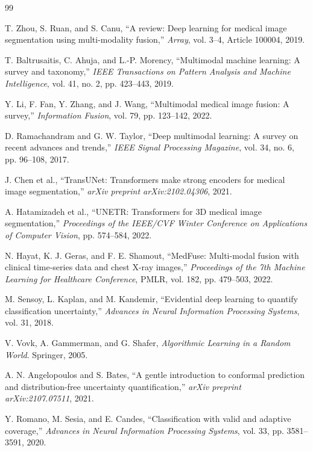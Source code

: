 \documentclass[preprint,11pt]{elsarticle}
\begin{document}
\begin{thebibliography}{99}

T. Zhou, S. Ruan, and S. Canu,
``A review: Deep learning for medical image segmentation using multi-modality fusion,''
\emph{Array}, vol. 3--4, Article 100004, 2019.

T. Baltrusaitis, C. Ahuja, and L.-P. Morency,
``Multimodal machine learning: A survey and taxonomy,''
\emph{IEEE Transactions on Pattern Analysis and Machine Intelligence}, vol. 41, no. 2, pp. 423--443, 2019.

Y. Li, F. Fan, Y. Zhang, and J. Wang,
``Multimodal medical image fusion: A survey,''
\emph{Information Fusion}, vol. 79, pp. 123--142, 2022.

D. Ramachandram and G. W. Taylor,
``Deep multimodal learning: A survey on recent advances and trends,''
\emph{IEEE Signal Processing Magazine}, vol. 34, no. 6, pp. 96--108, 2017.

J. Chen et al.,
``TransUNet: Transformers make strong encoders for medical image segmentation,''
\emph{arXiv preprint arXiv:2102.04306}, 2021.

A. Hatamizadeh et al.,
``UNETR: Transformers for 3D medical image segmentation,''
\emph{Proceedings of the IEEE/CVF Winter Conference on Applications of Computer Vision}, pp. 574--584, 2022.

N. Hayat, K. J. Geras, and F. E. Shamout,
``MedFuse: Multi-modal fusion with clinical time-series data and chest X-ray images,''
\emph{Proceedings of the 7th Machine Learning for Healthcare Conference},
PMLR, vol. 182, pp. 479--503, 2022.

M. Sensoy, L. Kaplan, and M. Kandemir,
``Evidential deep learning to quantify classification uncertainty,''
\emph{Advances in Neural Information Processing Systems}, vol. 31, 2018.

V. Vovk, A. Gammerman, and G. Shafer,
\emph{Algorithmic Learning in a Random World}.
Springer, 2005.

A. N. Angelopoulos and S. Bates,
``A gentle introduction to conformal prediction and distribution-free uncertainty quantification,''
\emph{arXiv preprint arXiv:2107.07511}, 2021.

Y. Romano, M. Sesia, and E. Candes,
``Classification with valid and adaptive coverage,''
\emph{Advances in Neural Information Processing Systems}, vol. 33, pp. 3581--3591, 2020.


\end{thebibliography}
\end{document}
